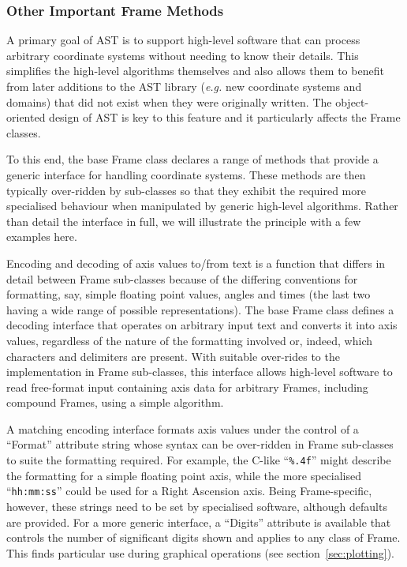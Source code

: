 \documentclass[final,authoryear,5p,times,twocolumn]{elsarticle}
\begin{document}
\subsubsection{Other Important Frame Methods}
A primary goal of AST is to support high-level software that can process
arbitrary coordinate systems without needing to know their details. This
simplifies the high-level algorithms themselves and also allows them to
benefit from later additions to the AST library (\emph{e.g.} new coordinate
systems and domains) that did not exist when they were originally
written. The object-oriented design of AST is key to this feature and it
particularly affects the Frame classes.

To this end, the base Frame class declares a range of methods that
provide a generic interface for handling coordinate systems. These
methods are then typically over-ridden by sub-classes so that they
exhibit the required more specialised behaviour when manipulated by
generic high-level algorithms. Rather than detail the interface in full,
we will illustrate the principle with a few examples here.

Encoding and decoding of axis values to/from text is a function that
differs in detail between Frame sub-classes because of the differing
conventions for formatting, say, simple floating point values, angles and
times (the last two having a wide range of possible representations). The
base Frame class defines a decoding interface that operates on arbitrary
input text and converts it into axis values, regardless of the nature of
the formatting involved or, indeed, which characters and delimiters are
present. With suitable over-rides to the implementation in Frame
sub-classes, this interface allows high-level software to read
free-format input containing axis data for arbitrary Frames, including
compound Frames, using a simple algorithm.

A matching encoding interface formats axis values under the control of a
``Format'' attribute string whose syntax can be over-ridden in Frame
sub-classes to suite the formatting required. For example, the C-like
``\texttt{\%.4f}'' might describe the formatting for a simple floating
point axis, while the more specialised ``\texttt{hh:mm:ss}'' could be
used for a Right Ascension axis. Being Frame-specific, however, these
strings need to be set by specialised software, although defaults are
provided. For a more generic interface, a ``Digits'' attribute is
available that controls the number of significant digits shown and
applies to any class of Frame. This finds particular use during graphical
operations (see section~\ref{sec:plotting}).
\end{document}
